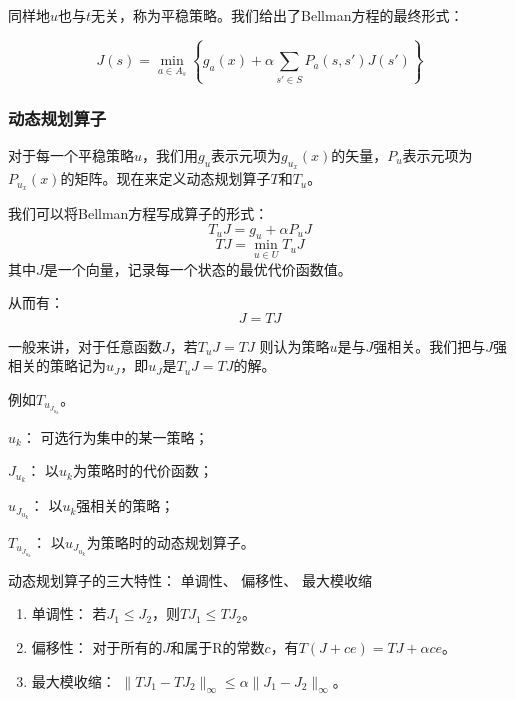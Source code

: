 同样地$u$也与$t$无关，称为平稳策略。我们给出了Bellman方程的最终形式：

\begin{equation}
    J(s)=\min_{a\in A_s}\left\{ g_a(x)+\alpha\sum_{s'\in S}P_a(s,s')J(s')\right\}
\end{equation}

\subsubsection{动态规划算子}

对于每一个平稳策略$u$，我们用$g_u$表示元项为$g_{u_x}(x)$的矢量，$P_u$表示元项为$P_{u_x}(x)$的矩阵。现在来定义动态规划算子$T$和$T_u$。

我们可以将Bellman方程写成算子的形式：
\begin{equation}
    T_uJ=g_u+\alpha P_uJ
\end{equation}
\begin{equation}
    TJ=\min_{u\in U}T_uJ
\end{equation}
其中$J$是一个向量，记录每一个状态的最优代价函数值。

从而有：
\begin{equation}
    J=TJ
\end{equation}

一般来讲，对于任意函数$J$，若$T_uJ=TJ$ 则认为策略$u$是与$J$强相关。我们把与$J$强相关的策略记为$u_J$，即$u_J$是$T_uJ=TJ$的解。

\begin{note}
    例如$T_{u_{J_{u_{k}}}}$。

    $u_{k}$： 可选行为集中的某一策略；

    $J_{u_{k}}$： 以$u_{k}$为策略时的代价函数；

    $u_{J_{u_{k}}}$： 以$u_{k}$强相关的策略；

    $T_{u_{J_{u_{k}}}}$： 以$u_{J_{u_{k}}}$为策略时的动态规划算子。
\end{note}

动态规划算子的三大特性： 单调性、 偏移性、 最大模收缩

\begin{enumerate}[itemsep=0pt,parsep=0pt]
    \item 单调性： 若$J_1\leq J_2$，则$TJ_1\leq TJ_2$。
    \item 偏移性： 对于所有的$J$和属于R的常数$c$，有$T(J+ce)=TJ+\alpha ce$。
    \item 最大模收缩： $\|TJ_1-TJ_2\|_{\infty}\leq \alpha \|J_1-J_2\|_{\infty}$。
\end{enumerate}

